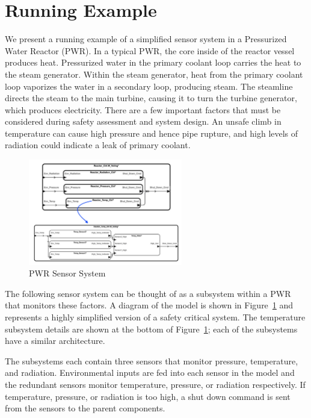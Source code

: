\section{Running Example}
\label{sec:example}
We present a running example of a simplified sensor system in a Pressurized Water Reactor (PWR). In a typical PWR, the core inside of the reactor vessel produces heat. Pressurized water in the primary coolant loop carries the heat to the steam generator. Within the steam generator, heat from the primary coolant loop vaporizes the water in a secondary loop, producing steam. The steamline directs the steam to the main turbine, causing it to turn the turbine generator, which produces electricity. There are a few important factors that must be considered during safety assessment and system design. An unsafe climb in temperature can cause high pressure and hence pipe rupture, and high levels of radiation could indicate a leak of primary coolant. 

\begin{figure}[h!]
	\begin{center}
		\includegraphics[width=0.6\textwidth]{images/sensorSysAADL.png}
	\end{center}
	\vspace{-2em}
	\caption{PWR Sensor System}
	\label{fig:sensorSys}
\end{figure}

The following sensor system can be thought of as a subsystem within a PWR that monitors these factors. A diagram of the model is shown in Figure~\ref{fig:sensorSys} and represents a highly simplified version of a safety critical system. The temperature subsystem details are shown at the bottom of Figure~\ref{fig:sensorSys}; each of the subsystems have a similar architecture.

The subsystems each contain three sensors that monitor pressure, temperature, and radiation. Environmental inputs are fed into each sensor in the model and the redundant sensors monitor temperature, pressure, or radiation respectively. If temperature, pressure, or radiation is too high, a shut down command is sent from the sensors to the parent components. 

